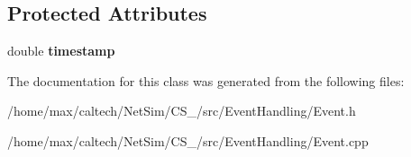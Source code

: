 \subsection*{\-Protected \-Attributes}
\begin{DoxyCompactItemize}
\item 
\hypertarget{classEvent_abf947fd0c5db2bf468373ee94ec190b4}{double {\bfseries timestamp}}\label{classEvent_abf947fd0c5db2bf468373ee94ec190b4}

\end{DoxyCompactItemize}


\-The documentation for this class was generated from the following files\-:\begin{DoxyCompactItemize}
\item 
/home/max/caltech/\-Net\-Sim/\-C\-S\-\_/src/\-Event\-Handling/\-Event.\-h\item 
/home/max/caltech/\-Net\-Sim/\-C\-S\-\_/src/\-Event\-Handling/\-Event.\-cpp\end{DoxyCompactItemize}
